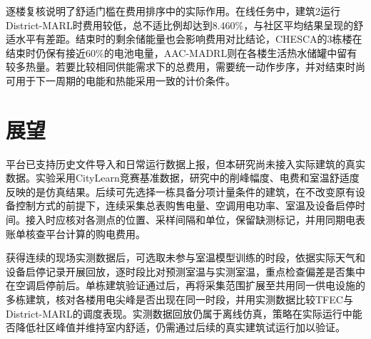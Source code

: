 逐楼复核说明了舒适门槛在费用排序中的实际作用。在线任务中，建筑2运行District-MARL时费用较低，总不适比例却达到$8.460\%$，与社区平均结果呈现的舒适水平有差距。结束时的剩余储能量也会影响费用对比结论，CHESCA的3栋楼在结束时仍保有接近$60\%$的电池电量，AAC-MADRL则在各楼生活热水储罐中留有较多热量。若要比较相同供能需求下的总费用，需要统一动作步序，并对结束时尚可用于下一周期的电能和热能采用一致的计价条件。

\section{展望}
平台已支持历史文件导入和日常运行数据上报，但本研究尚未接入实际建筑的真实数据。实验采用CityLearn竞赛基准数据，研究中的削峰幅度、电费和室温舒适度反映的是仿真结果。后续可先选择一栋具备分项计量条件的建筑，在不改变原有设备控制方式的前提下，连续采集总表购售电量、空调用电功率、室温及设备启停时间。接入时应核对各测点的位置、采样间隔和单位，保留缺测标记，并用同期电表账单核查平台计算的购电费用。

获得连续的现场实测数据后，可选取未参与室温模型训练的时段，依据实际天气和设备启停记录开展回放，逐时段比对预测室温与实测室温，重点检查偏差是否集中在空调启停前后。单栋建筑验证通过后，再将采集范围扩展至共用同一供电设施的多栋建筑，核对各楼用电尖峰是否出现在同一时段，并用实测数据比较TFEC与District-MARL的调度表现。实测数据回放仍属于离线仿真，策略在实际运行中能否降低社区峰值并维持室内舒适，仍需通过后续的真实建筑试运行加以验证。
